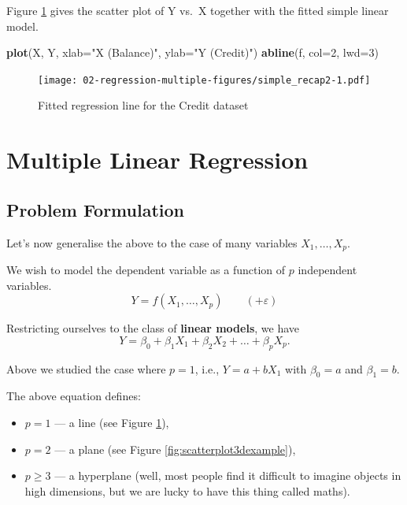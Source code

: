 \documentclass[10pt,b5paper,krantz1]{krantz}
\newenvironment{Shaded}{\begin{snugshade}}{\end{snugshade}}
\newcommand{\DataTypeTok}[1]{\textcolor[rgb]{0.27,0.27,0.27}{#1}}
\newcommand{\DecValTok}[1]{\textcolor[rgb]{0.06,0.06,0.06}{#1}}
\newcommand{\KeywordTok}[1]{\textcolor[rgb]{0.27,0.27,0.27}{\textbf{#1}}}
\newcommand{\NormalTok}[1]{#1}
\newcommand{\StringTok}[1]{\textcolor[rgb]{0.5,0.5,0.5}{#1}}
\providecommand{\tightlist}{%
  \setlength{\itemsep}{0pt}\setlength{\parskip}{0pt}}
\begin{document}
Figure \ref{fig:simple_recap2} gives the scatter plot
of Y vs.~X together with the fitted simple linear model.

\begin{Shaded}
\begin{Highlighting}[]
\KeywordTok{plot}\NormalTok{(X, Y, }\DataTypeTok{xlab=}\StringTok{"X (Balance)"}\NormalTok{, }\DataTypeTok{ylab=}\StringTok{"Y (Credit)"}\NormalTok{)}
\KeywordTok{abline}\NormalTok{(f, }\DataTypeTok{col=}\DecValTok{2}\NormalTok{, }\DataTypeTok{lwd=}\DecValTok{3}\NormalTok{)}
\end{Highlighting}
\end{Shaded}

\begin{figure}
\hypertarget{fig:simple_recap2}{%
\centering
\texttt{[image: 02-regression-multiple-figures/simple\_recap2-1.pdf]}
\caption{Fitted regression line for the Credit dataset}\label{fig:simple_recap2}
}
\end{figure}

\hypertarget{multiple-linear-regression}{%
\section{Multiple Linear Regression}\label{multiple-linear-regression}}

\hypertarget{problem-formulation}{%
\subsection{Problem Formulation}\label{problem-formulation}}

Let's now generalise the above to the case of many variables
\(X_1, \dots, X_p\).

We wish to model the dependent variable as a function of \(p\) independent variables.
\[
Y = f(X_1,\dots,X_p)   \qquad (+\varepsilon)
\]

Restricting ourselves to the class of \textbf{linear models}, we have
\[
Y = \beta_0 + \beta_1 X_1 + \beta_2 X_2 + \dots + \beta_p X_p.
\]

Above we studied the case where \(p=1\), i.e., \(Y=a+bX_1\) with \(\beta_0=a\) and \(\beta_1=b\).

The above equation defines:

\begin{itemize}
\tightlist
\item
  \(p=1\) --- a line (see Figure \ref{fig:simple_recap2}),
\item
  \(p=2\) --- a plane (see Figure \ref{fig:scatterplot3dexample}),
\item
  \(p\ge 3\) --- a hyperplane (well, most people find it difficult
  to imagine objects in high dimensions,
  but we are lucky to have this thing called maths).
\end{itemize}
\end{document}
